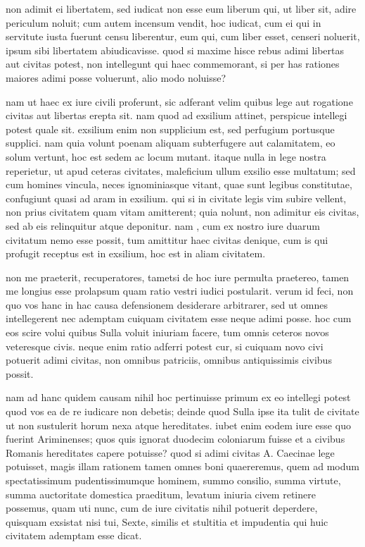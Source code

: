  non adimit ei libertatem, sed iudicat non esse eum liberum qui, ut liber sit, adire periculum noluit; cum autem incensum vendit, hoc iudicat, cum ei qui in servitute iusta fuerunt censu liberentur, eum qui, cum liber esset, censeri noluerit, ipsum sibi libertatem abiudicavisse. quod si maxime hisce rebus adimi libertas aut civitas potest, non intellegunt qui haec commemorant, si per has rationes maiores adimi posse voluerunt, alio modo noluisse?

 nam ut haec ex iure civili proferunt, sic adferant velim quibus lege aut rogatione civitas aut libertas erepta sit. nam quod ad exsilium attinet, perspicue intellegi potest quale sit. exsilium enim non supplicium est, sed perfugium portusque supplici. nam quia volunt poenam aliquam subterfugere aut calamitatem, eo solum vertunt, hoc est sedem ac locum mutant. itaque nulla in lege nostra reperietur, ut apud ceteras civitates, maleficium ullum exsilio esse multatum; sed cum homines vincula, neces ignominiasque vitant, quae sunt legibus constitutae, confugiunt quasi ad aram in exsilium. qui si in civitate legis vim subire vellent, non prius civitatem quam vitam amitterent; quia nolunt, non adimitur eis civitas, sed ab eis relinquitur atque deponitur. nam , cum ex nostro iure duarum civitatum nemo esse possit, tum amittitur haec civitas denique, cum is qui profugit receptus est in exsilium, hoc est in aliam civitatem.

 non me praeterit, recuperatores, tametsi de hoc iure permulta praetereo, tamen me longius esse prolapsum quam ratio vestri iudici postularit. verum id feci, non quo vos hanc in hac causa defensionem desiderare arbitrarer, sed ut omnes intellegerent nec ademptam cuiquam civitatem esse neque adimi posse. hoc cum eos scire volui quibus Sulla voluit iniuriam facere, tum omnis ceteros novos veteresque civis. neque enim ratio adferri potest cur, si cuiquam novo civi potuerit adimi civitas, non omnibus patriciis, omnibus antiquissimis civibus possit.

 nam ad hanc quidem causam nihil hoc pertinuisse primum ex eo intellegi potest quod vos ea de re iudicare non debetis; deinde quod Sulla ipse ita tulit de civitate ut non sustulerit horum nexa atque hereditates. iubet enim eodem iure esse quo fuerint Ariminenses; quos quis ignorat duodecim coloniarum fuisse et a civibus Romanis hereditates capere potuisse? quod si adimi civitas A. Caecinae lege potuisset, magis illam rationem tamen omnes boni quaereremus, quem ad modum spectatissimum pudentissimumque hominem, summo consilio, summa virtute, summa auctoritate domestica praeditum, levatum iniuria civem retinere possemus, quam uti nunc, cum de iure civitatis nihil potuerit deperdere, quisquam exsistat nisi tui, Sexte, similis et stultitia et impudentia qui huic civitatem ademptam esse dicat.

